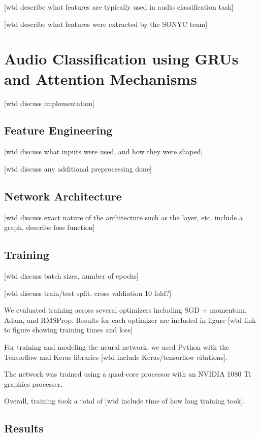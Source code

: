 [wtd describe what features are typically used in audio classification task]

[wtd describe what features were extracted by the SONYC team]

\chapter{Audio Classification using GRUs and Attention Mechanisms}

[wtd discuss implementation]

\section{Feature Engineering}

[wtd discuss what inputs were used, and how they were shaped]

[wtd discuss any additional preprocessing done]

\section{Network Architecture}

[wtd discuss exact nature of the architecture such as the layer, etc. include a graph, describe loss function]

\section{Training}

[wtd discuss batch sizes, number of epochs]

[wtd discuss train/test split, cross valdiation 10 fold?]

We evaluated training across several optimizers including SGD + momentum, Adam, and RMSProp.  Results for each optimizer are included in figure [wtd link to figure showing training times and loss]

For training and modeling the neural network, we used Python with the Tensorflow and Keras libraries [wtd include Keras/tensorflow citations].

The network was trained using a quad-core processor with an NVIDIA 1080 Ti graphics processer.

Overall, training took a total of [wtd include time of how long training took].

\section{Results}


